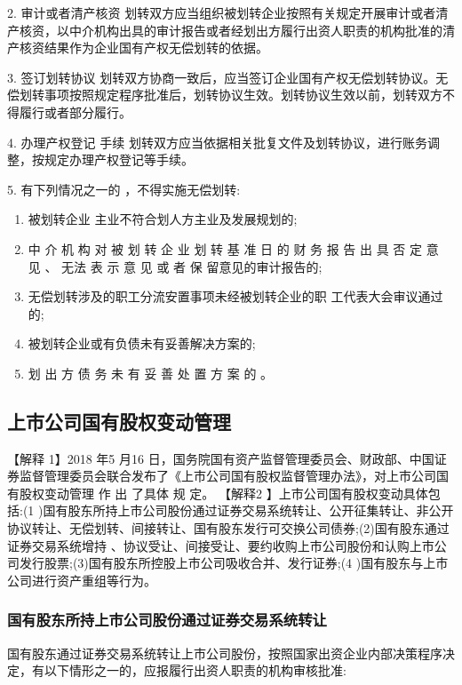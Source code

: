 \documentclass[UTF8,12pt]{ctexart}
\numberwithin{equation}{section} %
\numberwithin{figure}{section}
\numberwithin{table}{section}
\begin{document}
	2. 审计或者清产核资
	划转双方应当组织被划转企业按照有关规定开展审计或者清产核资，以中介机构出具的审计报告或者经划出方履行出资人职责的机构批准的清产核资结果作为企业国有产权无偿划转的依据。
	
	3. 签订划转协议
	划转双方协商一致后，应当签订企业国有产权无偿划转协议。无偿划转事项按照规定程序批准后，划转协议生效。划转协议生效以前，划转双方不得履行或者部分履行。
	
	4. 办理产权登记 手续
	划转双方应当依据相关批复文件及划转协议，进行账务调整，按规定办理产权登记等手续。
	
	5. 有下列情况之一的 ，不得实施无偿划转:
	\begin{enumerate}
		\item 被划转企业 主业不符合划人方主业及发展规划的;
		
		\item 中 介 机 构 对 被 划 转 企 业 划 转 基 准 日 的 财 务 报 告 出 具 否 定 意 见 、 无法 表 示 意 见 或 者 保 留意见的审计报告的;
		
		\item 无偿划转涉及的职工分流安置事项未经被划转企业的职 工代表大会审议通过的;
		
		\item 被划转企业或有负债未有妥善解决方案的;
		
		\item  划 出 方 债 务 未 有 妥 善 处 置 方 案 的 。
	\end{enumerate}
	
	
	
	\subsection{上市公司国有股权变动管理}	
	【解释 1】2018 年5 月16 日，国务院国有资产监督管理委员会、财政部、中国证券监督管理委员会联合发布了《上市公司国有股权监督管理办法》，对上市公司国有股权变动管理 作 出 了具体 规 定。
	【解释2 】上市公司国有股权变动具体包括:(1 )国有股东所持上市公司股份通过证券交易系统转让、公开征集转让、非公开协议转让、无偿划转、间接转让、国有股东发行可交换公司债券;(2)国有股东通过证券交易系统增持 、协议受让、间接受让、要约收购上市公司股份和认购上市公司发行股票;(3)国有股东所控股上市公司吸收合并、发行证券;(4 )国有股东与上市公司进行资产重组等行为。
	
	\subsubsection{国有股东所持上市公司股份通过证券交易系统转让}
	国有股东通过证券交易系统转让上市公司股份，按照国家出资企业内部决策程序决定，有以下情形之一的，应报履行出资人职责的机构审核批准:
\end{document}
